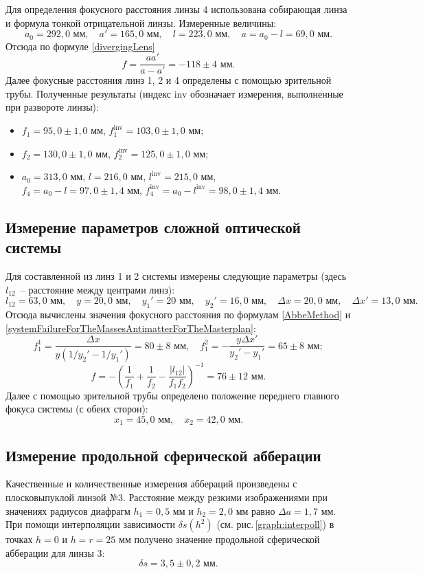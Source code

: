 \documentclass[a4paper,12pt]{article} %
\begin{document}
Для определения фокусного расстояния линзы 4 использована собирающая линза и формула тонкой отрицательной линзы. Измеренные величины:
$$a_0 = 292,0\text{ мм},\quad a' = 165,0\text{ мм},\quad l = 223,0\text{ мм},\quad a = a_0 - l = 69,0\text{ мм}.$$
Отсюда по формуле \eqref{divergingLens}
$$f = \frac{aa'}{a-a'} = -118\pm4\text{ мм}.$$
Далее фокусные расстояния линз 1, 2 и 4 определены с помощью зрительной трубы.
Полученные результаты (индекс inv обозначает измерения, выполненные при развороте линзы):
\begin{itemize}
    \item $f_1 = 95,0 \pm 1,0$ мм,   $f_1^\text{inv} = 103,0 \pm 1,0$ мм;
    \item $f_2 = 130,0 \pm 1,0$ мм,   $f_2^\text{inv} = 125,0 \pm 1,0$ мм;
    \item $a_0 = 313,0$ мм,   $l = 216,0$ мм,   $l^\text{inv} = 215,0$ мм, \\ $f_4 = a_0 - l = 97,0 \pm 1,4$ мм,   $f_4^\text{inv} = a_0 - l^\text{inv} = 98,0 \pm 1,4$ мм.
\end{itemize}

\subsection{Измерение параметров сложной оптической системы}

Для составленной из линз 1 и 2 системы измерены следующие параметры (здесь $l_{12}$~-- расстояние между центрами линз):
$$l_{12} = 63,0\text{ мм},\quad y=20,0\text{ мм},\quad y_1'=20\text{ мм},\quad y_2'=16,0\text{ мм},\quad \Delta x = 20,0\text{ мм},\quad \Delta x' = 13,0\text{ мм}.$$
Отсюда вычислены значения фокусного расстояния по формулам \eqref{AbbeMethod} и \eqref{systemFailureForTheMassesAntimatterForTheMasterplan}:
$$f_1^1 = \frac{\Delta x}{y(1/y_2' - 1/y_1')} = 80 \pm 8 \text{ мм},\quad f_1^2 = -\frac{y\Delta x'}{y_2' - y_1'} = 65 \pm 8 \text{ мм};$$
$$f = -\left(\frac{1}{f_1} + \frac{1}{f_2} - \frac{|l_{12}|}{f_1f_2}\right)^{-1} = 76\pm 12\text{ мм}.$$
Далее с помощью зрительной трубы определено положение переднего главного фокуса системы (с обеих сторон):
$$x_1 = 45,0\text{ мм},\quad x_2 = 42,0\text{ мм}.$$

\subsection{Измерение продольной сферической абберации}

Качественные и количественные измерения аббераций произведены с плосковыпуклой линзой №3. Расстояние между резкими изображениями при значениях радиусов диафрагм $h_1 = 0,5$ мм и $h_2 = 2,0$ мм равно $\Delta a = 1,7$ мм. При помощи интерполяции зависимости $\delta s(h^2)$ (см. рис.\,\ref{graph:interpoll}) в точках $h = 0$ и $h = r = 25$ мм получено значение продольной сферической абберации для линзы 3:
$$\delta s = 3,5 \pm 0,2\text{ мм}.$$
\end{document}
